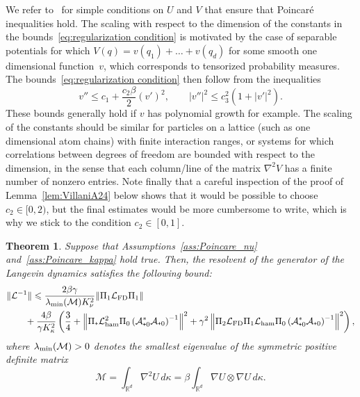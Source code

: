 \documentclass{article}
\newtheorem{theorem}{Theorem}
\newcommand{\cL}{\mathcal{L}}
\newcommand{\cLa}{\mathcal{A}}
\newcommand{\cLham}{\mathcal{L}_{\rm ham}}
\newcommand{\cLFD}{\mathcal{L}_{\rm FD}}
\newcommand{\R}{\mathbb{R}}
\newcommand{\subplus}{\textnormal{\texttt{+}}}
\renewcommand{\leq}{\leqslant}
\begin{document}
We refer to~\cite{BBCG} for simple conditions on $U$ and $V$ that ensure that Poincar\'e inequalities hold. The scaling with respect to the dimension of the constants in the bounds~\eqref{eq:regularization condition} is motivated by the case of separable potentials for which $V(q) = v(q_1) + \dots + v(q_d)$ for some smooth one dimensional function~$v$, which corresponds to tensorized probability measures. The bounds~\eqref{eq:regularization condition} then follow from the inequalities
\[
  v'' \leq c_1 + \frac{c_2 \beta}{2} (v')^2, \qquad \left|v''\right|^2 \leq c_3^2 \left( 1+\left|v'\right|^2 \right).
\]
These bounds generally hold if $v$ has polynomial growth for example. The scaling of the constants should be similar for particles on a lattice (such as one dimensional atom chains) with finite interaction ranges, or systems for which correlations between degrees of freedom are bounded with respect to the dimension, in the sense that each column/line of the matrix $\nabla^2 V$ has a finite number of nonzero entries. Note finally that a careful inspection of the proof of Lemma~\ref{lem:VillaniA24} below shows that it would be possible to choose $c_2 \in [0,2)$, but the final estimates would be more cumbersome to write, which is why we stick to the condition $c_2 \in [0,1]$.

\begin{theorem}
  Suppose that Assumptions~\ref{ass:Poincare_nu} and~\ref{ass:Poincare_kappa} hold true. Then, the resolvent of the generator of the Langevin dynamics satisfies the following bound:
\begin{equation}
  \label{eq:bounds_invL_Langevin}
  \begin{aligned}
    & \|\cL^{-1}\| \leq \frac{2\beta\gamma}{\lambda_{\rm min}(\mathcal{M}) K_\nu^2} \|\Pi_1 \cLFD \Pi_1\| \\ 
    & \qquad + \frac{4\beta}{\gamma K_\kappa^2} \left( \frac34 + \left\| \Pi_\subplus \cLham^2 \Pi_0 \left(\cLa_{\subplus 0}^*\cLa_{\subplus 0}\right)^{-1} \right\|^2 + \gamma^2 \left\| \Pi_2 \cLFD \Pi_1 \cLham \Pi_0 \left(\cLa_{\subplus 0}^*\cLa_{\subplus 0}\right)^{-1} \right\|^2 \right),
  \end{aligned}
\end{equation}
where $\lambda_{\rm min}(\mathcal{M}) > 0$ denotes the smallest eigenvalue of the symmetric positive definite matrix
\[
\mathcal{M} = \int_{\R^d} \nabla^2 U \, d\kappa = \beta \int_{\R^d} \nabla U \otimes \nabla U \, d\kappa.
\]
\end{theorem}
\end{document}
